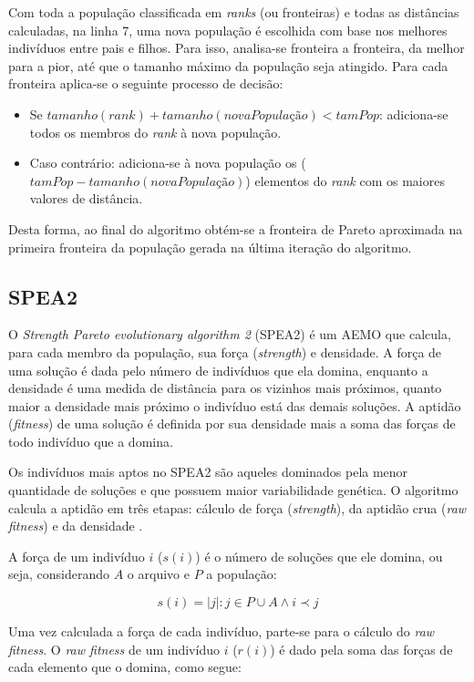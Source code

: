 Com toda a população classificada em \textit{ranks} (ou fronteiras) e todas as distâncias calculadas, na linha 7, uma nova população é escolhida com base nos melhores indivíduos entre pais e filhos. Para isso, analisa-se fronteira a fronteira, da melhor para a pior, até que o tamanho máximo da população seja atingido. Para cada fronteira aplica-se o seguinte processo de decisão:

\begin{itemize}  
	\item Se $tamanho(rank) + tamanho(novaPopulação) < tamPop$: adiciona-se todos os membros do \textit{rank} à nova população.
	\item Caso contrário: adiciona-se à nova população os ($tamPop - tamanho(novaPopulação)$) elementos do \textit{rank} com os maiores valores de distância.
\end{itemize}

Desta forma, ao final do algoritmo obtém-se a fronteira de Pareto aproximada na primeira fronteira da população gerada na última iteração do algoritmo.

\subsection{SPEA2}

O \textit{Strength Pareto evolutionary algorithm 2} (SPEA2) \cite{Zitzler2002} é um AEMO que calcula, para cada membro da população, sua força (\textit{strength}) e densidade. A força de uma solução é dada pelo número de indivíduos que ela domina, enquanto a densidade é uma medida de distância para os vizinhos mais próximos, quanto maior a densidade mais próximo o indivíduo está das demais soluções. A aptidão (\textit{fitness}) de uma solução é definida por sua densidade mais a soma das forças de todo indivíduo que a domina. 

Os indivíduos mais aptos no SPEA2 são aqueles dominados pela menor quantidade de soluções e que possuem maior variabilidade genética. O algoritmo calcula a aptidão em três etapas: cálculo de força (\textit{strength}), da aptidão crua (\textit{raw fitness}) e da densidade \cite{Zitzler2002}.

A força de um indivíduo $i$ ($s(i)$) é o número de soluções que ele domina, ou seja, considerando $A$ o arquivo e $P$ a população:

\[ s(i) = |j|: j \in P \cup A \land i \prec j \]

Uma vez calculada a força de cada indivíduo, parte-se para o cálculo do \textit{raw fitness}. O \textit{raw fitness} de um indivíduo $i$ ($r(i)$) é dado pela soma das forças de cada elemento que o domina, como segue:

